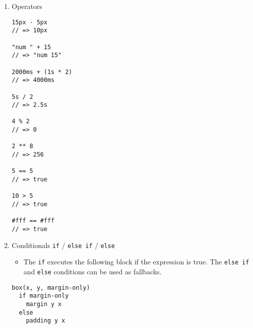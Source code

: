 \documentclass[10pt, twocolumn]{article}
\begin{document}
\begin{enumerate}

\item Operators
\begin{lstlisting}[frame=single]
15px - 5px
// => 10px

"num " + 15
// => "num 15"

2000ms + (1s * 2)
// => 4000ms

5s / 2
// => 2.5s

4 % 2
// => 0

2 ** 8
// => 256

5 == 5
// => true

10 > 5
// => true

#fff == #fff
// => true
\end{lstlisting}

\item Conditionals \texttt{if} / \texttt{else if} / \texttt{else}
\begin{itemize}
\item The \texttt{if} executes the following block if the expression is true.  The \texttt{else if} and \texttt{else} conditions can be used as fallbacks. 
\end{itemize}
\begin{lstlisting}[frame=single]
box(x, y, margin-only)
  if margin-only
    margin y x
  else
    padding y x
\end{lstlisting}

\end{enumerate}
\end{document}
